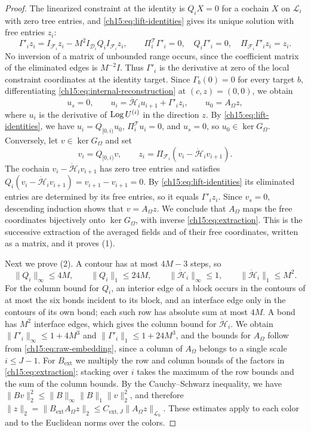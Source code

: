 \begin{proof}
The linearized constraint at the identity is $Q_iX=0$ for a cochain $X$ on $\mathcal L_i$ with zero tree entries, and \eqref{ch15:eq:lift-identities} gives its unique solution with free entries $z_i$:
\[
 \Gamma'_i z_i=I_{\mathcal F_i}z_i-M^2I_{\mathcal D_i}Q_iI_{\mathcal F_i}z_i,\qquad
 \Pi^{\mathcal T}_i\Gamma'_i=0,\quad Q_i\Gamma'_i=0,\quad \Pi_{\mathcal F_i}\Gamma'_i z_i=z_i .
\]
No inversion of a matrix of unbounded range occurs, since the coefficient matrix of the eliminated edges is $M^{-2}I$. Thus $\Gamma'_i$ is the derivative at zero of the local constraint coordinates at the identity target. Since $\Gamma_b(0)=0$ for every target $b$, differentiating \eqref{ch15:eq:internal-reconstruction} at $(c,z)=(0,0)$, we obtain
\[
 u_s=0,\qquad u_i=\dot{\mathcal H}_iu_{i+1}+\Gamma'_iz_i,\qquad
 u_0=A_\Omega z,
\]
where $u_i$ is the derivative of $\operatorname{Log} U^{(i)}$ in the direction $z$. By \eqref{ch15:eq:lift-identities}, we have $u_i=Q_{[0,i)}u_0$, $\Pi^{\mathcal T}_iu_i=0$, and $u_s=0$, so $u_0\in\ker G_\Omega$. Conversely, let $v\in\ker G_\Omega$ and set
\[
 v_i=Q_{[0,i)}v,\qquad
 z_i=\Pi_{\mathcal F_i}(v_i-\dot{\mathcal H}_iv_{i+1}).
\]
The cochain $v_i-\dot{\mathcal H}_iv_{i+1}$ has zero tree entries and satisfies $Q_i(v_i-\dot{\mathcal H}_iv_{i+1})=v_{i+1}-v_{i+1}=0$. By \eqref{ch15:eq:lift-identities} its eliminated entries are determined by its free entries, so it equals $\Gamma'_iz_i$. Since $v_s=0$, descending induction shows that $v=A_\Omega z$. We conclude that $A_\Omega$ maps the free coordinates bijectively onto $\ker G_\Omega$, with inverse \eqref{ch15:eq:extraction}. This is the successive extraction of the averaged fields and of their free coordinates, written as a matrix, and it proves (1).

Next we prove (2). A contour has at most $4M-3$ steps, so
\[
 \|Q_i\|_\infty\le4M,\qquad \|Q_i\|_1\le24M,
 \qquad \|\dot{\mathcal H}_i\|_\infty\le1,\qquad\|\dot{\mathcal H}_i\|_1\le M^2 .
\]
For the column bound for $Q_i$, an interior edge of a block occurs in the contours of at most the six bonds incident to its block, and an interface edge only in the contours of its own bond; each such row has absolute sum at most $4M$. A bond has $M^2$ interface edges, which gives the column bound for $\dot{\mathcal H}_i$. We obtain $\|\Gamma'_i\|_\infty\le1+4M^3$ and $\|\Gamma'_i\|_1\le1+24M^3$, and the bounds for $A_\Omega$ follow from \eqref{ch15:eq:raw-embedding}, since a column of $A_\Omega$ belongs to a single scale $i\le J-1$. For $B_{\mathrm{ext}}$ we multiply the row and column bounds of the factors in \eqref{ch15:eq:extraction}; stacking over $i$ takes the maximum of the row bounds and the sum of the column bounds. By the Cauchy--Schwarz inequality, we have $\|Bv\|_2^2\le\|B\|_\infty\|B\|_1\|v\|_2^2$, and therefore $\|z\|_2=\|B_{\mathrm{ext}}A_\Omega z\|_2\le C_{\mathrm{ext},J}\|A_\Omega z\|_{\mathcal L_0}$. These estimates apply to each color and to the Euclidean norms over the colors.


\end{proof}
